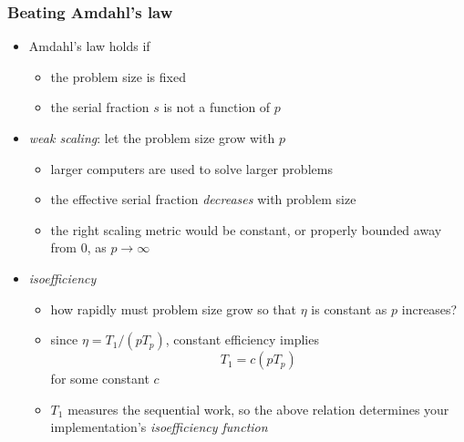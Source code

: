 \begin{frame}[fragile]
%
  \frametitle{Beating Amdahl's law}
%
  \begin{itemize}
  \item Amdahl's law holds if
    \begin{itemize}
      \item the problem size is fixed
      \item the serial fraction $s$ is not a function of $p$
    \end{itemize}
%
  \item {\em weak scaling}: let the problem size grow with $p$
    \begin{itemize}
    \item larger computers are used to solve larger problems
    \item the effective serial fraction {\em decreases} with problem size
    \item the right scaling metric would be constant, or properly bounded away from 0, as $p
      \rightarrow \infty$
    \end{itemize}
%
  \item {\em isoefficiency}
    \begin{itemize}
      \item how rapidly must problem size grow so that $\eta$ is constant as $p$ increases?
      \item since $\eta = T_{1}/(pT_{p})$, constant efficiency implies
        \[
        T_{1} = c (p T_{p})
        \]
        for some constant $c$
      \item $T_{1}$ measures the sequential work, so the above relation determines your
        implementation's {\em isoefficiency function}
    \end{itemize}
%
  \end{itemize}
%
\end{frame}



